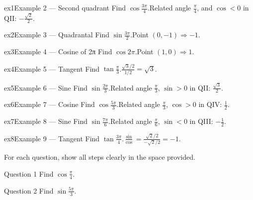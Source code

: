 \documentclass[11pt]{article}
\begin{document}
\begin{example}{ex1}{Example 2 --- Second quadrant}
Find $\cos\tfrac{3\pi}{4}$.\soln Related angle $\tfrac{\pi}{4}$, and $\cos<0$ in QII: $-\tfrac{\sqrt2}{2}$.
\end{example}

\begin{example}{ex2}{Example 3 --- Quadrantal}
Find $\sin\tfrac{3\pi}{2}$.\soln Point $(0,-1)\Rightarrow-1$.
\end{example}

\begin{example}{ex3}{Example 4 --- Cosine of 2π}
Find $\cos 2\pi$.\soln Point $(1,0)\Rightarrow1$.
\end{example}

\begin{example}{ex4}{Example 5 --- Tangent}
Find $\tan\tfrac{\pi}{3}$.\soln $\tfrac{\sqrt3/2}{1/2}=\sqrt3$.
\end{example}

\begin{example}{ex5}{Example 6 --- Sine}
Find $\sin\tfrac{2\pi}{3}$.\soln Related angle $\tfrac{\pi}{3}$, $\sin>0$ in QII: $\tfrac{\sqrt3}{2}$.
\end{example}

\begin{example}{ex6}{Example 7 --- Cosine}
Find $\cos\tfrac{5\pi}{3}$.\soln Related angle $\tfrac{\pi}{3}$, $\cos>0$ in QIV: $\tfrac12$.
\end{example}

\begin{example}{ex7}{Example 8 --- Sine}
Find $\sin\tfrac{7\pi}{6}$.\soln Related angle $\tfrac{\pi}{6}$, $\sin<0$ in QIII: $-\tfrac12$.
\end{example}

\begin{example}{ex8}{Example 9 --- Tangent}
Find $\tan\tfrac{3\pi}{4}$.\soln $\tfrac{\sin}{\cos}=\tfrac{\sqrt2/2}{-\sqrt2/2}=-1$.
\end{example}

\clearpage
{}
For each question, show all steps clearly in the space provided.

\begin{qbox}{Question 1}
Find $\cos\tfrac{\pi}{4}$.\workspace{2.4cm}
\end{qbox}

\begin{qbox}{Question 2}
Find $\sin\tfrac{5\pi}{3}$.\workspace{2.4cm}
\end{qbox}
\end{document}
